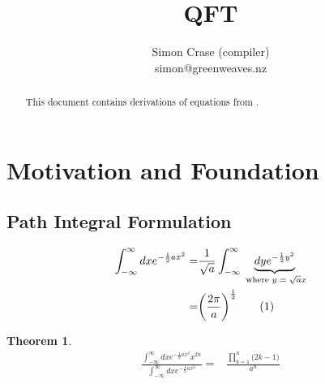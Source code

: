 \documentclass[]{article}
\title{QFT}
\author{Simon Crase (compiler)\\simon@greenweaves.nz}
\newcommand\numberthis{\addtocounter{equation}{1}\tag{\theequation}}
\newtheorem{thm}{Theorem}
\begin{document}
\maketitle

\begin{abstract}

This document contains derivations of equations from \cite{zee2010quantum}.

\end{abstract}

\section{Motivation and Foundation}
\subsection{Path Integral Formulation}

\begin{align*}
	\int_{-\infty}^{\infty} dx e^{-\frac{1}{2}ax^2} =& \frac{1}{\sqrt{a}}\int_{-\infty}^{\infty} \underbrace{dy e^{-\frac{1}{2}y^2}}_\text{ where $y=\sqrt{a}x$} \\
	=& \bigg(\frac{2\pi}{a}\bigg)^\frac{1}{2} \numberthis \label{eq:integral:gaussian}
\end{align*}
\begin{thm}
	\begin{align*}
		\frac{\int_{-\infty}^\infty dx e^{-\frac{1}{2}ax^2}x^{2n}}{\int_{-\infty}^\infty dx e^{-\frac{1}{2}ax^2}} =&\frac{\prod_{k=1}^{n}\big(2k-1\big)}{a^n}
	\end{align*}
\end{thm}
\end{document}
